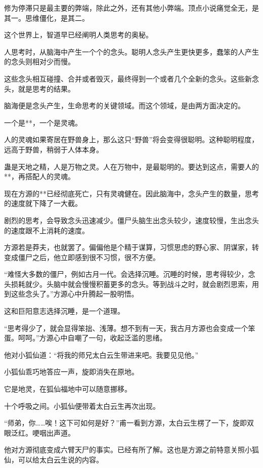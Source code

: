 
\begin{this_body}

修为停滞只是最主要的弊端，除此之外，还有其他小弊端。顶点小说痛觉全无，是其一。思维僵化，是其二。

这个世界上，智道早已经阐明人类思考的奥秘。

人思考时，从脑海中产生一个个的念头。聪明人念头产生更快更多，蠢笨的人产生的念头则相对少而慢。

这些念头相互碰撞、合并或者毁灭，最终得到一个或者几个全新的念头。这些新念头，就是思考的结果。

脑海便是念头产生，生命思考的关键领域。而这个领域，是由两方面决定的。

一个是**，一个是灵魂。

人的灵魂如果寄居在野兽身上，那么这只“野兽”将会变得很聪明。这种聪明程度，远高于野兽，稍弱于人体本身。

蛊是天地之精，人是万物之灵。人在万物中，是最聪明的。要达到这点，需要人的**，再搭配人的灵魂。

现在方源的**已经彻底死亡，只有灵魂健在。因此脑海中，念头产生的数量，思考的速度就下降了一大截。

剧烈的思考，会导致念头迅速减少。僵尸头脑生出念头较少，速度较慢，生出念头的速度跟不上消耗的速度。

方源若是莽夫，也就罢了。偏偏他是个精于谋算，习惯思虑的野心家、阴谋家，转变成僵尸之后，他立即感到很不习惯，很不方便。

“难怪大多数的僵尸，例如古月一代。会选择沉睡。沉睡的时候，思考得较少，念头损耗就少。头脑中就会慢慢积蓄更多的念头。等到战斗之时，就会剧烈思索，用到这些念头了。”方源心中升腾起一股明悟。

这和巨阳意志选择沉睡，是一个道理。

“思考得少了，就会显得笨拙、浅薄。想不到有一天，我古月方源也会变成一个笨蛋。呵呵。”方源心中自嘲了一句，收起泛滥的思绪。

他对小狐仙道：“将我的师兄太白云生带进来吧。我要见见他。”

小狐仙乖巧地答应一声，旋即消失在原地。

它是地灵，在狐仙福地中可以随意挪移。

十个呼吸之间。小狐仙便带着太白云生再次出现。

“师弟，你……唉！这下可如何是好？”甫一看到方源，太白云生楞了一下，旋即双眼泛红。哽咽出声道。

他对方源彻底变成六臂天尸的事实。已经有所了解。这也是方源之前特意关照小狐仙，可以给太白云生说的内容。


\end{this_body}
